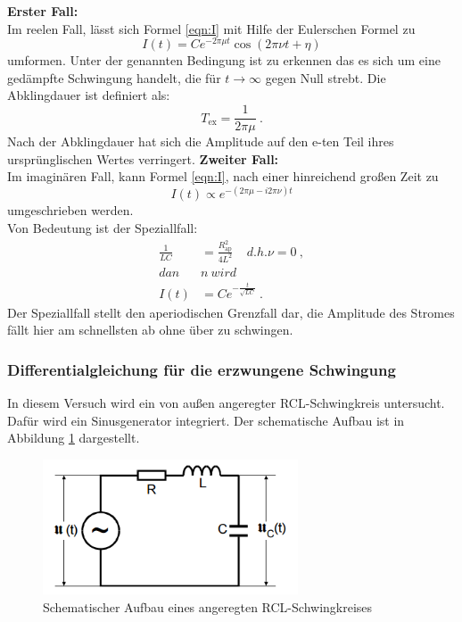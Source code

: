\textbf{Erster Fall:} \\
Im reelen Fall, lässt sich Formel \ref{eqn:I} mit Hilfe der Eulerschen Formel zu
\begin{equation}
	I(t) = C e^{-2 \pi \mu t} \cos(2 \pi \nu t + \eta)
\end{equation}
umformen. Unter der genannten Bedingung ist zu erkennen das es sich um eine gedämpfte Schwingung handelt, die für $t \to \infty$ gegen Null strebt. Die Abklingdauer ist definiert als:
\begin{equation}
	T_\text{ex} = \frac{1}{2 \pi \mu} \ .
\end{equation}
Nach der Abklingdauer hat sich die Amplitude auf den e-ten Teil ihres ursprünglischen Wertes verringert.
\newline
\newline
\textbf{Zweiter Fall:} \\
Im imaginären Fall, kann Formel \ref{eqn:I}, nach einer hinreichend großen Zeit zu
\begin{equation}
	I(t) \propto e^{-(2 \pi \mu - i2 \pi \nu)t}
\end{equation}
umgeschrieben werden. \\
Von Bedeutung ist der Speziallfall:
\begin{align*}
	\frac{1}{LC} & = \frac{R_\text{ap}^2}{4L^2} \ \ \ \ \ d.h. \nu = 0 \ , \\
	dan&n \ wird \\
	I(t) & = C e^{- \frac{t}{\sqrt{LC}}} \ .
\end{align*}
Der Speziallfall stellt den aperiodischen Grenzfall dar, die Amplitude des Stromes fällt hier am schnellsten ab ohne über zu schwingen.

\subsubsection{Differentialgleichung für die erzwungene Schwingung}
In diesem Versuch wird ein von außen angeregter RCL-Schwingkreis untersucht. Dafür wird ein Sinusgenerator integriert. Der schematische Aufbau ist in Abbildung \ref{fig:aRCL} dargestellt.

\begin{figure}[H]
	\centering
	\includegraphics[height=4cm]{picture/Theorie2.PNG}
	\caption{Schematischer Aufbau eines angeregten RCL-Schwingkreises \cite[6]{sample}}
	\label{fig:aRCL}
\end{figure}

